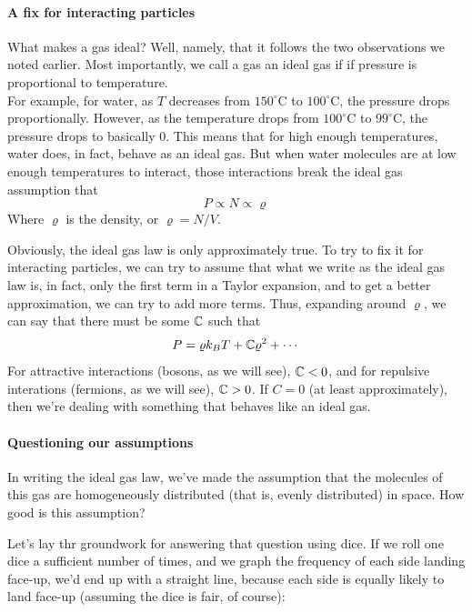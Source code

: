 \documentclass[a4paper]{article}
\begin{document}
\paragraph{A fix for interacting particles}
What makes a gas ideal? Well, namely, that it follows the two observations we
noted earlier. Most importantly, we call a gas an ideal gas if if pressure is
proportional to temperature.\\
For example, for water, as $T$ decreases from $150^\circ$C to $100^\circ$C,
the pressure drops proportionally. However, as the temperature drops from
$100^\circ$C to $99^\circ$C, the pressure drops to basically 0. This means that
for high enough temperatures, water does, in fact, behave as an ideal gas.
But when water molecules are at low enough temperatures to interact, those
interactions break the ideal gas assumption that
\[ P\propto N \propto \varrho \]
Where $\varrho$ is the density, or $\varrho = N/V$.

Obviously, the ideal gas law is only approximately true. To try to fix it for
interacting particles, we can try to assume that what we write as the ideal gas
law is, in fact, only the first term in a Taylor expansion, and to get a better
approximation, we can try to add more terms. Thus, expanding around
$\varrho$, we can say that there must be some $\mathbb{C}$ such that
\[ P = \varrho k_B T + \mathbb{C}\varrho^2 + \cdots \]
For attractive interactions (bosons, as we will see), $\mathbb{C} < 0$, and for
repulsive interations (fermions, as we will see), $\mathbb{C} > 0$. If $C = 0$ (at
least approximately), then we're dealing with something that behaves like an
ideal gas.

\paragraph{Questioning our assumptions}
In writing the ideal gas law, we've made the assumption that the molecules of
this gas are homogeneously distributed (that is, evenly distributed) in space.
How good is this assumption?

Let's lay thr groundwork for answering that question using dice. If
we roll one dice a sufficient number of times, and we graph the frequency of
each side landing face-up, we'd end up with a straight line, because each
side is equally likely to land face-up (assuming the dice is fair, of course):
\begin{center}
\end{center}
\end{document}

